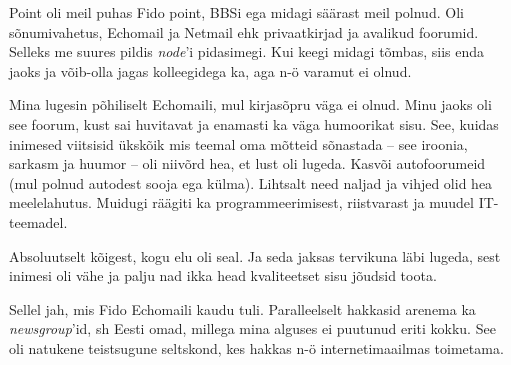 
Point oli meil puhas Fido point, BBSi ega midagi säärast meil polnud. 
Oli sõnumivahetus, Echomail ja Netmail ehk 
privaatkirjad ja avalikud foorumid. Selleks me 
suures pildis \emph{node}'i pidasimegi. Kui keegi midagi tõmbas, siis enda jaoks ja võib-olla jagas kolleegidega ka, aga n-ö varamut ei olnud.


Mina lugesin põhiliselt Echomaili, mul kirjasõpru väga ei olnud. Minu 
jaoks oli see foorum, kust sai huvitavat ja enamasti ka väga 
humoorikat sisu. See, kuidas inimesed viitsisid ükskõik mis teemal 
oma mõtteid sõnastada -- see iroonia, sarkasm ja huumor -- oli niivõrd hea, et lust oli 
lugeda. Kasvõi autofoorumeid (mul polnud autodest sooja ega külma). Lihtsalt need naljad ja vihjed olid hea 
meelelahutus. Muidugi räägiti ka programmeerimisest, riistvarast ja 
muudel IT-teemadel.


Absoluutselt kõigest, kogu elu oli seal. Ja seda jaksas tervikuna 
läbi lugeda, sest inimesi oli vähe ja palju nad ikka head kvaliteetset sisu 
jõudsid toota.


Sellel jah, mis Fido Echomaili kaudu tuli. Paralleelselt 
hakkasid arenema ka \emph{newsgroup}'id, sh Eesti omad, millega mina 
alguses ei puutunud eriti kokku. See oli natukene teistsugune seltskond, kes hakkas n-ö internetimaailmas toimetama. 


